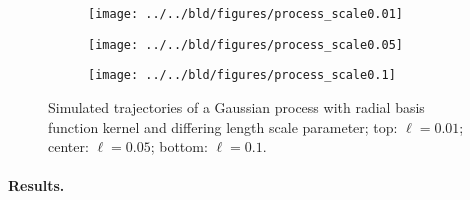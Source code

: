 \begin{figure}

\centering
\begin{subfigure}[b]{\textwidth}
\begin{tcolorbox}[standard jigsaw, opacityback=0, top=0pt, left=0pt, right=0pt, bottom=0pt]
    \texttt{[image: ../../bld/figures/process\_scale0.01]}
\end{tcolorbox}
\end{subfigure}

\hfill

\begin{subfigure}[b]{\textwidth}
\centering
\begin{tcolorbox}[standard jigsaw, opacityback=0, top=0pt, left=0pt, right=0pt, bottom=0pt]
    \texttt{[image: ../../bld/figures/process\_scale0.05]}
\end{tcolorbox}
\end{subfigure}

\hfill

\begin{subfigure}[b]{\textwidth}
\centering
\begin{tcolorbox}[standard jigsaw, opacityback=0, top=0pt, left=0pt, right=0pt, bottom=0pt]
    \texttt{[image: ../../bld/figures/process\_scale0.1]}
\end{tcolorbox}
\end{subfigure}

\caption{Simulated trajectories of a Gaussian process with radial basis function kernel
and differing length scale parameter; top: $\ell = 0.01$; center: $\ell = 0.05$; bottom:
$\ell = 0.1$.}
\label{figure:process_scale_comparison}
\end{figure}


\paragraph{Results.}
